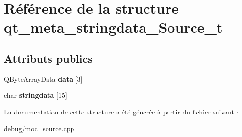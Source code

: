\hypertarget{structqt__meta__stringdata___source__t}{}\section{Référence de la structure qt\+\_\+meta\+\_\+stringdata\+\_\+\+Source\+\_\+t}
\label{structqt__meta__stringdata___source__t}
\subsection*{Attributs publics}
\begin{DoxyCompactItemize}
\item 
\mbox{\label{structqt__meta__stringdata___source__t_a602255b11f41094f620407fdc6e03b58}} 
Q\+Byte\+Array\+Data {\bfseries data} \mbox{[}3\mbox{]}
\item 
\mbox{\label{structqt__meta__stringdata___source__t_a7c62fe59d2ea1335dc6a0e48dfeafb12}} 
char {\bfseries stringdata} \mbox{[}15\mbox{]}
\end{DoxyCompactItemize}


La documentation de cette structure a été générée à partir du fichier suivant \+:\begin{DoxyCompactItemize}
\item 
debug/moc\+\_\+source.\+cpp\end{DoxyCompactItemize}
